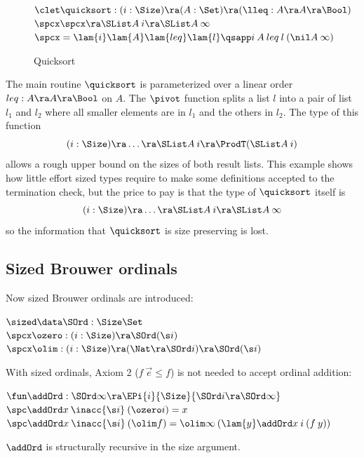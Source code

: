 \begin{figure}[htp]
{\begin{minipage}{0.8\textwidth}
\begin{bsp}
$\clet \quicksort : (i : \Size ) \ra (A : \Set ) \ra (\lleq : A \ra A \ra \Bool)$\\ 
$\spcx \spcx \ra \SList A\: i \ra \SList A\: \infty$\\
$\spcx = \lam{i}\lam{A}\lam{leq}\lam{l} \qsapp i\: A\: leq \: l \: (\nil A\: \infty)$ 
\end{bsp}
\end{minipage}
}
\caption{Quicksort}
\label{fsort}
\end{figure}

The main routine $\quicksort$ is parameterized over a linear order $leq : A \ra A \ra \Bool$ on $A$.
The $\pivot$ function splits a list $l$ into a pair of list $l_1$ and $l_2$ where all smaller elements are in $l_1$ and the others in $l_2$.
The type of this function  
\[ (i : \Size ) \ra \ldots \ra \SList A \: i \ra \ProdT (\SList A \: i) \]
\noindent allows a rough upper bound on the sizes of both result lists.
This example shows how little effort sized types require to make some definitions accepted
to the termination check, but the price to pay is that the type of $\quicksort$ itself is 
\[ (i : \Size ) \ra \ldots \ra \SList A\: i \ra \SList A\: \infty \]
\noindent so the information that $\quicksort$ is size preserving is lost.

\subsection{Sized Brouwer ordinals}
Now sized Brouwer ordinals are introduced:
\begin{bsp}
$\sized \data \SOrd : \Size \Set$ \\
$\spcx \ozero : (i : \Size ) \ra \SOrd (\s i) $\\
$\spcx \olim : ( i : \Size ) \ra (\Nat \ra \SOrd i) \ra \SOrd (\s i) $
\end{bsp}
With sized ordinals, Axiom 2 ($f \: \vec{e} \leq f$) is not needed to accept ordinal addition:
\begin{bsp}
$\fun \addOrd : \SOrd \infty \ra \EPi{i}{\Size}{\SOrd i \ra \SOrd \infty }$\\
$\spc \addOrd x\: \inacc{\s i}\: (\ozero i) = x $\\
$\spc \addOrd x\: \inacc{\s i}\: (\olim f)  = \olim \infty \: ( \lam{y} \addOrd  x \: i \: (f \: y))  $
\end{bsp}
$\addOrd$ is structurally recursive in the size argument.
